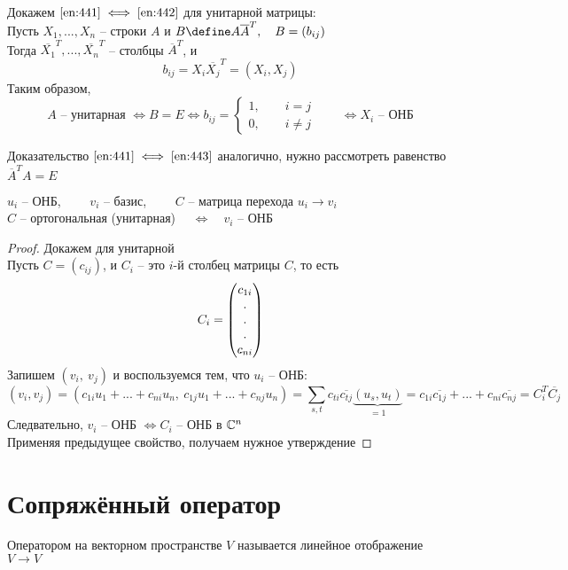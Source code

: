 \begin{props}
\begin{enumerate}
	\end{enumerate}
	\begin{iproof}
		\item Докажем $ \ref{en:441} \iff \ref{en:442} $ для унитарной матрицы: \\
		Пусть $ X_1, ..., X_n $ -- строки $ A $ и $ B \define A\overline{A}^T, \quad B = (b_{ij}) $ \\
		Тогда $ \overline{X_1}^T, ..., \overline{X_n}^T $ -- столбцы $ \overline{A}^T $, и
		$$ b_{ij} = X_i\overline{X_j}^T = (X_i, X_j) $$
		Таким образом,
		$$ A \text{ -- унитарная } \iff B = E \iff b_{ij} =
		\begin{cases}
			1, \qquad i = j \\
			0, \qquad i \ne j
		\end{cases} \qquad \iff X_i \text{ -- ОНБ} $$
		\item Доказательство $ \ref{en:441} \iff \ref{en:443} $ аналогично, нужно рассмотреть равенство $ \overline{A}^TA = E $
	\end{iproof}
	\item $ u_i $ -- ОНБ, $ \qquad v_i $ -- базис, $ \qquad C $ -- матрица перехода $ u_i \to v_i $ \\
	$ C $ -- ортогональная (унитарная) $ \quad \iff \quad v_i $ -- ОНБ
	\begin{proof}
		Докажем для унитарной \\
		Пусть $ C = (c_{ij}) $, и $ C_i $ -- это $ i $-й столбец матрицы $ C $, то есть
		$$ C_i = \column[pmatrix]{c_{1i}}{c_{ni}} $$
		Запишем $ (v_i, ~ v_j) $ и воспользуемся тем, что $ u_i $ -- ОНБ:
		$$ (v_i, v_j) = (c_{1i}u_1 + ... + c_{ni}u_n, ~ c_{1j}u_1 + ... + c_{nj}u_n) = \sum_{s, t} c_{ti}\overline{c_{tj}}\underbrace{(u_s, u_t)}_{= 1} = c_{1i}\overline{c_{1j}} + ... + c_{ni}\overline{c_{nj}} = C_i^T\overline{C_j} $$
		Следвательно, $ v_i $ -- ОНБ $ \iff C_i $ -- ОНБ в $ \Co^n $ \\
		Применяя предыдущее свойство, получаем нужное утверждение
	\end{proof}
\end{props}

\section{Сопряжённый оператор}

\begin{remind}
	Оператором на векторном пространстве $ V $ называется линейное отображение $ V \to V $
\end{remind}

